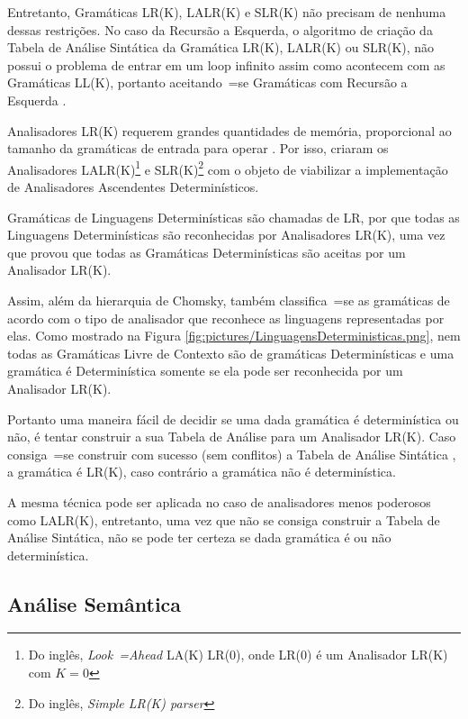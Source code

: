 {    Entretanto,
    Gramáticas LR(K), LALR(K) e
    SLR(K) não precisam de nenhuma dessas restrições.
    No caso da Recursão a Esquerda,
    o algoritmo de criação da Tabela de Análise Sintática da Gramática LR(K),
    LALR(K) ou SLR(K),
    não possui o problema de entrar em um loop infinito assim como acontecem com as Gramáticas LL(K),
    portanto aceitando~=se Gramáticas com Recursão a Esquerda \cite{ahoCompilerDragonBook}.

    Analisadores LR(K) requerem grandes quantidades de memória,
    proporcional ao tamanho da gramáticas de entrada para operar \cite{complexityOfLRKTesting}.
    Por isso,
     criaram os Analisadores LALR(K)\footnote{
    Do inglês, \textit{Look~=Ahead} LA(K) LR(0),
    onde LR(0) é um Analisador LR(K) com $K=0$
    }
    e SLR(K)\footnote{
    Do inglês, \textit{Simple LR(K) parser}
    }
    com o objeto de viabilizar a implementação de Analisadores Ascendentes Determinísticos.

    Gramáticas de Linguagens Determinísticas são chamadas de LR,
    por que todas as Linguagens Determinísticas são reconhecidas por Analisadores LR(K),
    uma vez que  provou que todas as Gramáticas Determinísticas são aceitas por um Analisador LR(K).

    Assim,
    além da hierarquia de Chomsky,
    também classifica~=se as gramáticas de acordo com o tipo de analisador que reconhece as linguagens representadas por elas.
    Como mostrado na Figura \ref{fig:pictures/LinguagensDeterministicas.png},
    nem todas as Gramáticas Livre de Contexto são de gramáticas Determinísticas e
    uma gramática é Determinística somente se ela pode ser reconhecida por um Analisador LR(K).

    Portanto uma maneira fácil de decidir se uma dada gramática é determinística ou
    não,
    é tentar construir a sua Tabela de Análise para um Analisador LR(K).
    Caso consiga~=se construir com sucesso (sem conflitos) a Tabela de Análise Sintática \cite{ahoCompilerDragonBook},
    a gramática é LR(K),
    caso contrário a gramática não é determinística.

    A mesma técnica pode ser aplicada no caso de analisadores menos poderosos como LALR(K),
    entretanto,
    uma vez que não se consiga construir a Tabela de Análise Sintática,
    não se pode ter certeza se dada gramática é ou não determinística.


\subsection{Análise Semântica}
\label{analiseSemantica}

}
